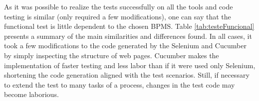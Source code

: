 \documentclass[runningheads,a4paper]{llncs}
\begin{document}

As it was possible to realize the tests successfully on all the tools and code testing is similar (only required a few modifications), one can say that the functional test is little dependent to the chosen BPMS. Table \ref{tab:testeFuncional} presents a summary of the main similarities and differences found. In all cases, it took a few modifications to the code generated by the Selenium and Cucumber by simply inspecting the structure of web pages. Cucumber makes the implementation of faster testing and less labor than if it were used only Selenium, shortening the code generation aligned with the test scenarios. Still, if necessary to extend the test to many tasks of a process, changes in the test code may become laborious.

\end{document}
